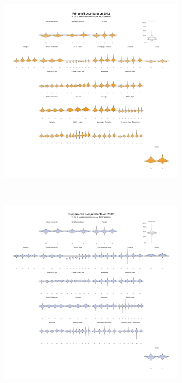 \begin{figure}[h]
\begin{subfigure}{0.3\textwidth}
	\end{subfigure}\\
	\begin{subfigure}{0.3\textwidth}
	\includegraphics[width = \textwidth]{Figs/AED/Geofacet_Distr_por_Dpto_Dip2_2012}
	\end{subfigure}
	~
	\begin{subfigure}{0.3\textwidth}
	\includegraphics[width = \textwidth]{Figs/AED/Geofacet_Distr_por_Dpto_Dip3_2012}

\end{subfigure}
\end{figure}
